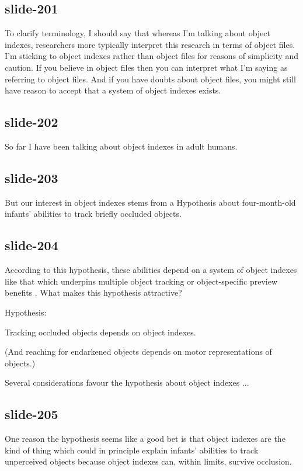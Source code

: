 \documentclass[12pt,\papersize]{extarticle}
\begin{document}
\subsection{slide-201}
To clarify terminology,
I should say that whereas I’m talking about object indexes,
researchers more typically interpret this research in terms of object
files.
I’m sticking to object indexes rather than object files for
reasons of simplicity and caution.
If you believe in object files then you can interpret what I’m saying
as referring to object files.
And if you have doubts about object files, you might still have reason
to accept that a system of object indexes exists.

\subsection{slide-202}
So far I have been talking about object indexes in adult humans.

\subsection{slide-203}
But our interest in object indexes stems from a Hypothesis about
four-month-old infants’
abilities to track briefly occluded objects.

\subsection{slide-204}
According to this hypothesis, these abilities depend on a system of
object indexes like that which underpins multiple object tracking or
object-specific preview benefits
\citep{Leslie:1998zk,Scholl:1999mi,Carey:2001ue,scholl:2007_objecta}.
What makes this hypothesis attractive?

Hypothesis:



Tracking occluded objects depends on object indexes.



(And reaching for endarkened objects depends on motor representations of objects.)


Several considerations favour the hypothesis about object indexes ...

\subsection{slide-205}
One reason the hypothesis seems like a good bet is that object
indexes are the kind of thing which could in principle explain
infants’ abilities to track unperceived objects because object indexes
can, within limits, survive occlusion.
\end{document}
